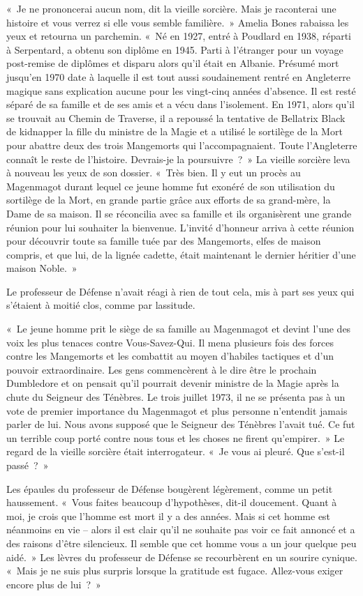 «~Je ne prononcerai aucun nom, dit la vieille sorcière. Mais je raconterai une histoire et vous verrez si elle vous semble familière.~» Amelia Bones rabaissa les yeux et retourna un parchemin. «~Né en 1927, entré à Poudlard en 1938, réparti à Serpentard, a obtenu son diplôme en 1945. Parti à l'étranger pour un voyage post-remise de diplômes et disparu alors qu'il était en Albanie. Présumé mort jusqu'en 1970 date à laquelle il est tout aussi soudainement rentré en Angleterre magique sans explication aucune pour les vingt-cinq années d'absence. Il est resté séparé de sa famille et de ses amis et a vécu dans l'isolement. En 1971, alors qu'il se trouvait au Chemin de Traverse, il a repoussé la tentative de Bellatrix Black de kidnapper la fille du ministre de la Magie et a utilisé le sortilège de la Mort pour abattre deux des trois Mangemorts qui l'accompagnaient. Toute l'Angleterre connaît le reste de l'histoire. Devrais-je la poursuivre~?~» La vieille sorcière leva à nouveau les yeux de son dossier. «~Très bien. Il y eut un procès au Magenmagot durant lequel ce jeune homme fut exonéré de son utilisation du sortilège de la Mort, en grande partie grâce aux efforts de sa grand-mère, la Dame de sa maison. Il se réconcilia avec sa famille et ils organisèrent une grande réunion pour lui souhaiter la bienvenue. L'invité d'honneur arriva à cette réunion pour découvrir toute sa famille tuée par des Mangemorts, elfes de maison compris, et que lui, de la lignée cadette, était maintenant le dernier héritier d'une maison Noble.~»

Le professeur de Défense n'avait réagi à rien de tout cela, mis à part ses yeux qui s'étaient à moitié clos, comme par lassitude.

«~Le jeune homme prit le siège de sa famille au Magenmagot et devint l'une des voix les plus tenaces contre Vous-Savez-Qui. Il mena plusieurs fois des forces contre les Mangemorts et les combattit au moyen d'habiles tactiques et d'un pouvoir extraordinaire. Les gens commencèrent à le dire être le prochain Dumbledore et on pensait qu'il pourrait devenir ministre de la Magie après la chute du Seigneur des Ténèbres. Le trois juillet 1973, il ne se présenta pas à un vote de premier importance du Magenmagot et plus personne n'entendit jamais parler de lui. Nous avons supposé que le Seigneur des Ténèbres l'avait tué. Ce fut un terrible coup porté contre nous tous et les choses ne firent qu'empirer.~» Le regard de la vieille sorcière était interrogateur. «~Je vous ai pleuré. Que s'est-il passé~?~»

Les épaules du professeur de Défense bougèrent légèrement, comme un petit haussement. «~Vous faites beaucoup d'hypothèses, dit-il doucement. Quant à moi, je crois que l'homme est mort il y a des années. Mais si cet homme est néanmoins en vie -- alors il est clair qu'il ne souhaite pas voir ce fait annoncé et a des raisons d'être silencieux. Il semble que cet homme vous a un jour quelque peu aidé.~» Les lèvres du professeur de Défense se recourbèrent en un sourire cynique. «~Mais je ne suis plus surpris lorsque la gratitude est fugace. Allez-vous exiger encore plus de lui~?~»

